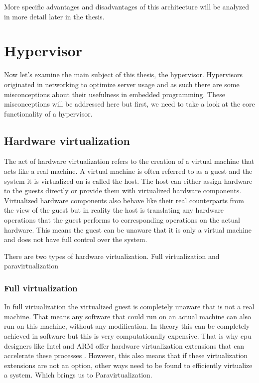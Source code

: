 More specific advantages and disadvantages of this architecture will be analyzed in more detail later in the thesis.

\section{Hypervisor}
Now let’s examine the main subject of this thesis, the hypervisor. Hypervisors originated in networking to optimize server usage and as such there are some misconceptions about their usefulness in embedded programming. These misconceptions will be addressed here but first, we need to take a look at the core functionality of a hypervisor.

\subsection{Hardware virtualization}
The act of hardware virtualization refers to the creation of a virtual machine that
acts like a real machine. A virtual machine is often referred to as a guest and the system it is virtualized on is called the host. The host can either assign hardware to the guests directly or provide them with virtualized hardware components. Virtualized hardware components also behave like their real counterparts from the view of the guest but in reality the host is translating any hardware operations that the guest performs to corresponding operations on the actual hardware. This means the guest can be unaware that it is only a virtual machine and does not have full control over the system.

There are two types of hardware virtualization. Full virtualization and paravirtualization
\subsubsection{Full virtualization}
In full virtualization the virtualized guest is completely unaware that is not a real machine. That means any software that could run on an actual machine can also run on this machine, without any modification.
In theory this can be completely achieved in software but this is very computationally expensive. That is why \acrshort{cpu} designers like Intel and ARM offer hardware virtualization extensions that can accelerate these processes \cite{uhlig2005intel}. However, this also means that if these virtualization extensions are not an option, other ways need to be found to efficiently virtualize a system. Which brings us to Paravirtualization.
